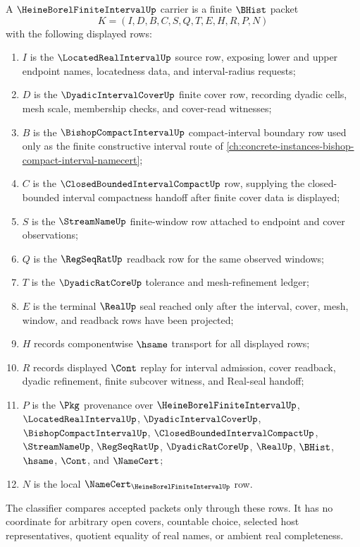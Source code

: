 \begin{definition}
\label{def:heine-borel-finite-interval-carrier}
A $\HeineBorelFiniteIntervalUp$ carrier is a finite $\BHist$ packet
$$
K=(I,D,B,C,S,Q,T,E,H,R,P,N)
$$
with the following displayed rows:
\begin{enumerate}
\item $I$ is the $\LocatedRealIntervalUp$ source row, exposing lower and upper endpoint names, locatedness data, and interval-radius requests;
\item $D$ is the $\DyadicIntervalCoverUp$ finite cover row, recording dyadic cells, mesh scale, membership checks, and cover-read witnesses;
\item $B$ is the $\BishopCompactIntervalUp$ compact-interval boundary row used only as the finite constructive interval route of \autoref{ch:concrete-instances-bishop-compact-interval-namecert};
\item $C$ is the $\ClosedBoundedIntervalCompactUp$ row, supplying the closed-bounded interval compactness handoff after finite cover data is displayed;
\item $S$ is the $\StreamNameUp$ finite-window row attached to endpoint and cover observations;
\item $Q$ is the $\RegSeqRatUp$ readback row for the same observed windows;
\item $T$ is the $\DyadicRatCoreUp$ tolerance and mesh-refinement ledger;
\item $E$ is the terminal $\RealUp$ seal reached only after the interval, cover, mesh, window, and readback rows have been projected;
\item $H$ records componentwise $\hsame$ transport for all displayed rows;
\item $R$ records displayed $\Cont$ replay for interval admission, cover readback, dyadic refinement, finite subcover witness, and Real-seal handoff;
\item $P$ is the $\Pkg$ provenance over $\HeineBorelFiniteIntervalUp$, $\LocatedRealIntervalUp$, $\DyadicIntervalCoverUp$, $\BishopCompactIntervalUp$, $\ClosedBoundedIntervalCompactUp$, $\StreamNameUp$, $\RegSeqRatUp$, $\DyadicRatCoreUp$, $\RealUp$, $\BHist$, $\hsame$, $\Cont$, and $\NameCert$;
\item $N$ is the local $\NameCert_{\HeineBorelFiniteIntervalUp}$ row.
\end{enumerate}
The classifier compares accepted packets only through these rows. It has no coordinate for arbitrary open covers, countable choice, selected host representatives, quotient equality of real names, or ambient real completeness.
\end{definition}

